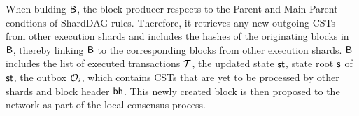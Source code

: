 \begin{itemize}
	      When bulding $\mathsf{B}$, the block producer respects to the
	      Parent and Main-Parent condtions of ShardDAG rules.
	      Therefore, it
	      retrieves any new outgoing CSTs from other execution shards
	      and includes
	      the hashes of the originating blocks in $\mathsf{B}$, thereby
	      linking $\mathsf{B}$
	      to the corresponding blocks from other execution shards.
	      $\mathsf{B}$
	      includes the list of executed transactions $
		      {\mathcal{T}} $, the updated state $ \mathsf{st} $, state root
	      $\mathsf{s}$ of
	      $\mathsf{st}$, the outbox $ \mathcal{O}_i $, which contains CSTs that
	      are yet to be
	      processed by other shards and block header $\mathsf{bh}$. This
	      newly created block is then proposed to
	      the network as part of the local consensus process.


\end{itemize}
